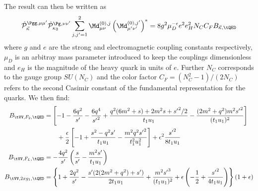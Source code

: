 The result can then be written as
\begin{equation}
\hat {\mathcal P}_{\vec \kappa}^{\Pgg,\mu\mu'}\hat {\mathcal P}_{\kappa_2}^{\Pg,\nu\nu'}\sum_{j,j'=1}^2\Md^{(0),j}_{\mu\nu}\left(\Md^{(0),j'}_{\mu'\nu'}\right)^* = 8g^2\mu_D^{-\epsilon}e^2e_H^2 N_C C_F B_{\vec \kappa,\tQED}
\end{equation}
where $g$ and $e$ are the strong and electromagnetic coupling constants respectively, $\mu_D$ is an arbitray mass parameter introduced to keep the couplings dimensionless and $e_H$ is the magnitude of the heavy quark in units of $e$. Further $N_C$ corresponds to the gauge group $SU(N_C)$ and the color factor $C_F=(N_C^2-1)/(2N_C)$ refers to the second Casimir constant of the fundamental representation for the quarks. We then find:
\begin{align}
B_{\tVV,F_2,\tQED} &= \left[-1 - \frac{6q^2}{s'} - \frac{6q^4}{{s'}^2} + \frac{q^2(6m^2+s) +2m^2 s + {s'}^2/2}{t_1u_1} - \frac{(2m^2+q^2)m^2{s'}^2}{(t_1 u_1)^2} \right] \nonumber\\
 &\hspace{20pt}+\frac{\epsilon}{2}\left[ -1 + \frac{s^2-q^2s'}{t_1u_1} - \frac{m^2q^2{s'}^2}{t_1^2u_1^2} \right] + \epsilon^2\frac{{s'}^2}{8t_1u_1}\\
B_{\tVV,F_L,\tQED} &= -\frac{4q^2}{s'}\left(\frac s {s'} - \frac{m^2s'}{t_1u_1}\right)\\
B_{\tVV,2xg_1,\tQED} &= \left\{1+ \frac{2q^2}{s'} - \frac{s'(2(2m^2+q^2)+s')}{2t_1 u_1} + \frac{m^2{s'}^3}{(t_1u_1)^2}+\epsilon\left(-\frac 1 2 + \frac{{s'}^2}{4t_1u_1}\right)\right\}(1+\epsilon)
\end{align}
